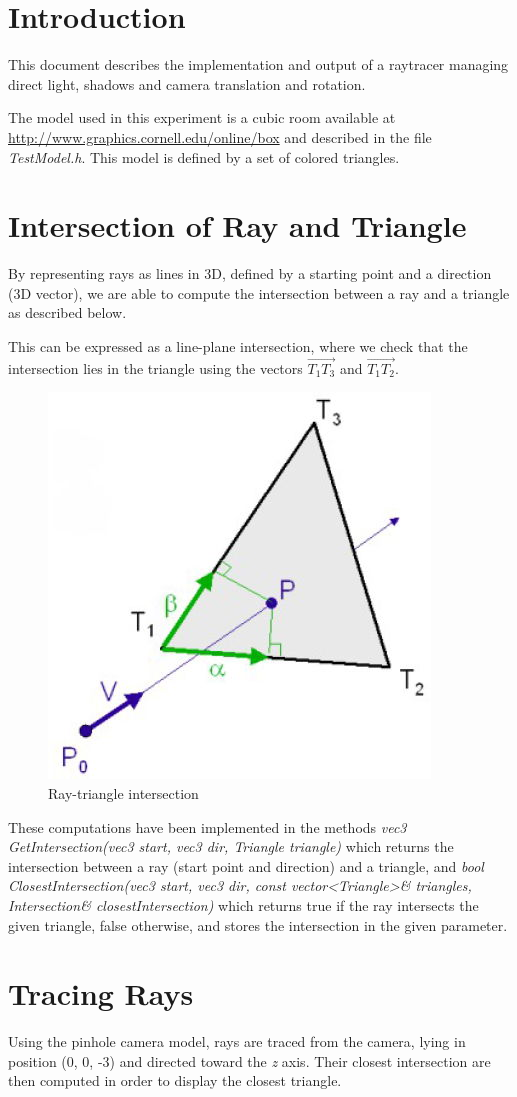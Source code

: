 \section*{Introduction}
This document describes the implementation and output of a raytracer managing direct light, shadows and camera translation and rotation.

The model used in this experiment is a cubic room available at \url{http://www.graphics.cornell.edu/online/box} and described in the file \textit{TestModel.h}. This model is defined by a set of colored triangles.

\setcounter{section}{1} 

\section{Intersection of Ray and Triangle}
By representing rays as lines in 3D, defined by a starting point and a direction (3D vector), we are able to compute the intersection between a ray and a triangle as described below.

This can be expressed as a line-plane intersection, where we check that the intersection lies in the triangle using the vectors $\vec{T_1T_3}$ and $\vec{T_1T_2}$.

\begin{figure}[H]
\centering
\includegraphics[width=0.3\linewidth]{img/ray.jpg}
\caption{Ray-triangle intersection}
\end{figure}

These computations have been implemented in the methods \textit{vec3 GetIntersection(vec3 start, vec3 dir, Triangle triangle)} which returns the intersection between a ray (start point and direction) and a triangle, and
\textit{bool ClosestIntersection(vec3 start, vec3 dir, const vector<Triangle>\& triangles, Intersection\& closestIntersection)} which returns true if the ray intersects the given triangle, false otherwise, and stores the intersection in the given parameter.

\section{Tracing Rays}
Using the pinhole camera model, rays are traced from the camera, lying in position (0, 0, -3) and directed toward the \textit{z} axis. Their closest intersection are then computed in order to display the closest triangle.


